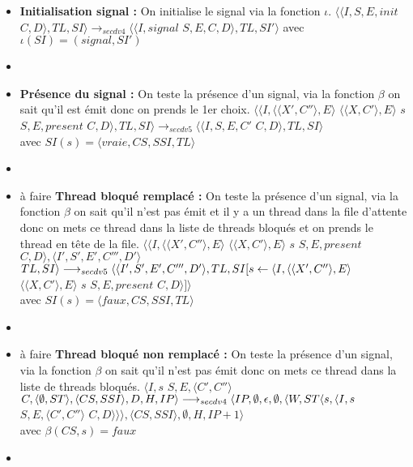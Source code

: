 \documentclass[10pt,a4paper]{article}
\begin{document}
\begin{enumerate}
\begin{itemize}
				\item[] \textbf{Initialisation signal :} On initialise le signal via la fonction $\iota$.
				\smallbreak 
				$\langle\langle I,S,E,init$ $C,D\rangle,TL,SI\rangle 
				\longrightarrow_{secdv4} \langle\langle I,signal$ $S,E,C,D\rangle,TL,SI'\rangle$
				avec $\iota(SI) = (signal,SI')$
				\item[]	
				
				\item[] \textbf{Présence du signal :} On teste la présence d'un signal, via la fonction $\beta$ on sait qu'il est émit donc on prends le 1er choix.
				\smallbreak
				$\langle\langle I,\langle\langle X',C''\rangle,E\rangle$ $\langle\langle X,C'\rangle,E\rangle$ $s$ $S,E,present$ $C,D\rangle,TL,SI\rangle 
				\longrightarrow_{secdv5} \langle\langle I,S,E,C'$ $C,D\rangle,TL,SI\rangle$ \\
				avec $SI(s) = \langle vraie,CS,SSI,TL\rangle$
				\item[]
				
				
				\item[] à faire \textbf{ Thread bloqué remplacé :} On teste la présence d'un signal, via la fonction $\beta$ on sait qu'il n'est pas émit et il y a un thread dans la file d'attente
				donc on mets ce thread dans la liste de threads bloqués et on prends le thread en tête de la file.
				\smallbreak
				$\langle\langle I,\langle\langle X',C''\rangle,E\rangle$ $\langle\langle X,C'\rangle,E\rangle$ $s$ $S,E,present$ $C,D\rangle,\langle I',S',E',C''',D'\rangle$ $TL,SI\rangle 
				\\\longrightarrow_{secdv5} \langle\langle I',S',E',C''',D'\rangle,TL,SI[s \leftarrow \langle I,\langle\langle X',C''\rangle,E\rangle$ $\langle\langle X,C'\rangle,E\rangle$ $s$ $S,E,present$ $C,D\rangle]\rangle$ \\avec $SI(s) = \langle faux,CS,SSI,TL\rangle$
				\item[]	
				
				\item[] à faire \textbf{Thread bloqué non remplacé :} On teste la présence d'un signal, via la fonction $\beta$ on sait qu'il n'est pas émit donc on mets ce thread dans la liste de threads bloqués.
				\smallbreak 
				$\langle I,s$ $S,E,\langle C',C''\rangle$ $C,\langle \emptyset,ST\rangle,\langle CS,SSI\rangle,D,H,IP\rangle 
				\\\longrightarrow_{secdv4} \langle IP,\emptyset,\epsilon,\emptyset,\langle W,ST\langle s,\langle I,s$ $S,E,\langle C',C''\rangle$ $C,D\rangle\rangle\rangle,\langle CS,SSI\rangle,\emptyset,H,IP+1\rangle$ \\
				avec $\beta(CS,s) = faux$
				\item[]
				

\end{itemize}
\end{enumerate}
\end{document}

